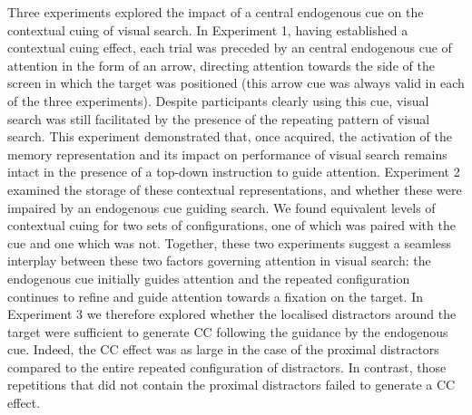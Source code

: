 \documentclass[
  man,floatsintext]{apa7}
\begin{document}
Three experiments explored the impact of a central endogenous cue on the contextual cuing of visual search. In Experiment 1, having established a contextual cuing effect, each trial was preceded by an central endogenous cue of attention in the form of an arrow, directing attention towards the side of the screen in which the target was positioned (this arrow cue was always valid in each of the three experiments). Despite participants clearly using this cue, visual search was still facilitated by the presence of the repeating pattern of visual search. This experiment demonstrated that, once acquired, the activation of the memory representation and its impact on performance of visual search remains intact in the presence of a top-down instruction to guide attention. Experiment 2 examined the storage of these contextual representations, and whether these were impaired by an endogenous cue guiding search. We found equivalent levels of contextual cuing for two sets of configurations, one of which was paired with the cue and one which was not. Together, these two experiments suggest a seamless interplay between these two factors governing attention in visual search: the endogenous cue initially guides attention and the repeated configuration continues to refine and guide attention towards a fixation on the target. In Experiment 3 we therefore explored whether the localised distractors around the target were sufficient to generate CC following the guidance by the endogenous cue. Indeed, the CC effect was as large in the case of the proximal distractors compared to the entire repeated configuration of distractors. In contrast, those repetitions that did not contain the proximal distractors failed to generate a CC effect.
\end{document}
